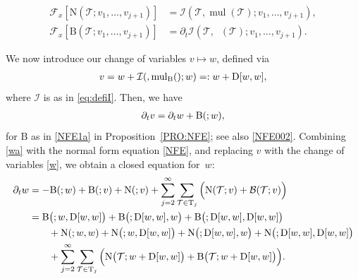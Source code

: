 \documentclass[%
11pt,  reqno]{amsart}
\makeatletter
\newcommand{\5}{\textup{V}}
\newcommand{\noi}{\noindent}
\newcommand{\dt}{\partial_t}
\theoremstyle{remark}
\newcommand{\TT}{\mathcal{T}}
\newcommand{\Tr}{\mathrm{T}}
\newcommand{\Ft}{{\mathcal{F}}}
\DeclareMathOperator{\mul}{mul}
\DeclareMathOperator{\mulB}{mul_{\BB}}
\def\<#1>{\csname MH@symb@#1\endcsname}
\newcommand{\B}{\mathcal{B}}
\newcommand{\Ical}{\mathcal{I}}
\numberwithin{equation}{section}
\numberwithin{theorem}{section}
\newcommand{\NN}{\mathrm{N}}
\newcommand{\BB}{\mathrm{B}}
\newcommand{\D}{\mathrm{D}}
\makeatother
\begin{document}
\noi
\begin{align*}
\Ft_x [\NN(\TT; v_1, \ldots, v_{j+1} ) ] 
&= 
\Ical(\TT,\mul(\TT) ; v_1, \ldots,
v_{j+1} )
, \\
\Ft_x [\BB(\TT; v_1, \ldots, v_{j+1}) ]  &=
\dt\Ical (\TT,\mulB(\TT) ; v_1,\dots,v_{j+1}).
\end{align*}


We now introduce our change of variables $v\mapsto w$, defined via
\begin{align}
\label{w}
v 
=
w + \Ical(\<1>, \mulB(\<1>); w)
=:
w + \D[w, w]
,
\end{align}
where $\Ical$ is as in \eqref{eq:defiI}. Then, we have
\begin{align}
\label{wa}
\dt v
=
\dt w  + \BB(\<1>; w), 
\end{align}
for $\BB$ as in 
\eqref{NFE1a} in 
Proposition~\ref{PRO:NFE}; see also \eqref{NFE002}.
%
Combining \eqref{wa} with the normal form equation \eqref{NFE}, and replacing $v$ with the change of variables \eqref{w}, we obtain a closed equation for~$w$:
\begin{align}
\dt w & = -  \BB(\<1>;w) + \BB(\<1>;v) + \NN(\<1>;v)
+ \sum_{j=2}^\infty \sum_{\TT\in\Tr_j} \Big( \NN(\TT; v)  +
\B(\TT; v) 
 \Big) \nonumber\\
& = 
 \BB\big(\<1>; w, \D[w, w] \big) 
+ \BB \big(\<1>; \D[w, w],w\big) 
+
\BB\big(\<1>; \D[w,w], \D[w, w]\big) 
  \nonumber\\
& \qquad 
+ \NN(\<1>; w ,w )  + \NN\big(\<1>; w, \D[w, w]\big) 
+
\NN\big(\<1>; \D[w, w], w\big) 
+ \NN\big(\<1>; \D[w, w],\D[w, w]\big) 
 \nonumber\\
& \qquad 
+ \sum_{j=2}^\infty \sum_{\TT\in \Tr_j} 
\Big( \NN\big(\TT; w+
\D[w, w]
\big) 
+  \BB\big(\TT; w + \D[w, w]\big) \Big).
\label{w1}
\end{align}
\end{document}
